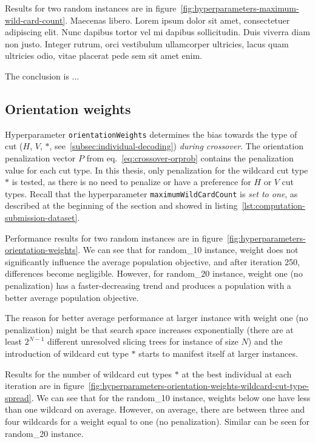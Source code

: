 Results for two random instances are in figure~\ref{fig:hyperparameters-maximum-wild-card-count}.
Maecenas libero. Lorem ipsum dolor sit amet, consectetuer adipiscing elit. Nunc dapibus tortor vel mi dapibus sollicitudin. Duis viverra diam non justo. Integer rutrum, orci vestibulum ullamcorper ultricies, lacus quam ultricies odio, vitae placerat pede sem sit amet enim.

The conclusion is ...

\subsection{Orientation weights}\label{subsec:orientation-weights}
Hyperparameter \verb|orientationWeights| determines the bias towards the type of cut ($H$, $V$, $*$, see~\ref{subsec:individual-decoding}) \textit{during crossover}.
The orientation penalization vector $P$ from eq.~\ref{eq:crossover-orprob} contains the penalization value for each cut type.
In this thesis, only penalization for the wildcard cut type $*$ is tested, as there is no need to penalize or have a preference for $H$ or $V$ cut types.
Recall that the hyperparameter \verb|maximumWildCardCount| is \textit{set to one}, as described at the beginning of the section and showed in listing~\ref{lst:computation-submission-dataset}.

Performance results for two random instances are in figure~\ref{fig:hyperparameters-orientation-weights}.
We can see that for random\_10 instance,
weight does not significantly influence the average population objective, and after iteration 250, differences become negligible.
However, for random\_20 instance,
weight one (no penalization) has a faster-decreasing trend and produces a population with a better average population objective.

The reason for better average performance at larger instance with weight one (no penalization) might
be that search space increases exponentially (there are at least $2^{N-1}$ different unresolved slicing trees for instance of size $N$) and the introduction of wildcard cut type $*$ starts to manifest itself
at larger instances.

Results for the number of wildcard cut types $*$ at the best individual at each iteration are in
figure~\ref{fig:hyperparameters-orientation-weights-wildcard-cut-type-spread}.
We can see that for the random\_10 instance, weights below one have less than one wildcard on average.
However, on average, there are between three and four wildcards for a weight equal to one (no penalization).
Similar can be seen for random\_20 instance.

